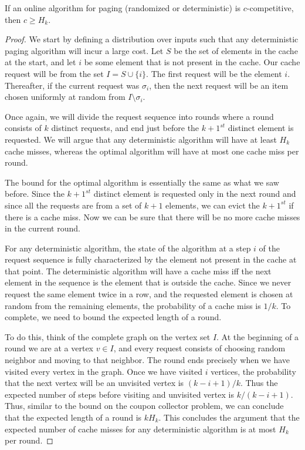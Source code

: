 \begin{theorem}
	If an online algorithm for paging (randomized or deterministic) is $c$-competitive, then $c \geq H_k$.
	\label{thm:lb-pagin}
\end{theorem}
\begin{proof}
	We start by defining a distribution over inputs such that any deterministic paging algorithm will incur a large cost. Let $S$ be the set of elements in the cache at the start, and let $i$ be some element that is not present in the cache. Our cache request will be from the set $I = S \cup \{i\}$. The first request will be the element $i$. Thereafter, if the current request was $\sigma_i$, then the next request will be an item chosen uniformly at random from $I \setminus \sigma_i$. 
	
	Once again, we will divide the request sequence into rounds where a round consists of $k$ distinct requests, and end just before the $k+1^{st}$ distinct element is requested. We will argue that any deterministic algorithm will have at least $H_k$ cache misses, whereas the optimal algorithm will have at most one cache miss per round. 
	
	The bound for the optimal algorithm is essentially the same as what we saw before. Since the $k+1^{st}$ distinct element is requested only in the next round and since all the requests are from a set of $k+1$ elements, we can evict the $k+1^{st}$ if there is a cache miss. Now we can be sure that there will be no more cache misses in the current round.
	
	For any deterministic algorithm, the state of the algorithm at a step $i$ of the request sequence is fully characterized by the element not present in the cache at that point. The deterministic algorithm will have a cache miss iff the next element in the sequence is the element that is outside the cache. Since we never request the same element twice in a row, and the requested element is chosen at random from the remaining elements, the probability of a cache miss is $1/k$. To complete, we need to bound the expected length of a round.
	
	To do this, think of the complete graph on the vertex set $I$. At the beginning of a round we are at a vertex $v \in I$, and every request consists of choosing random neighbor and moving to that neighbor. The round ends precisely when we have visited every vertex in the graph. Once we have visited $i$ vertices, the probability that the next vertex will be an unvisited vertex is $(k-i+1)/k$. Thus the expected number of steps before visiting and unvisited vertex is $k/(k-i+1)$. Thus, similar to the bound on the coupon collector problem, we can conclude that the expected length of a round is $kH_k$. This concludes the argument that the expected number of cache misses for any deterministic algorithm is at most $H_k$ per round.
\end{proof}

